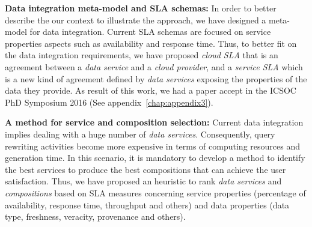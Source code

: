 \bigskip
\noindent \textbf{Data integration meta-model and SLA schemas:}
In order to better describe the our context to illustrate the approach, we have designed a meta-model for data integration. Current SLA schemas are focused on service properties aspects such as availability and response time. Thus, to better fit on the data integration requirements, we have proposed \textsl{cloud SLA} that is an agreement between a \textsl{data service} and a \textsl{cloud provider}, and a \textsl{service SLA} which is a new kind of agreement defined by \textsl{data services} exposing the properties of the data they provide. As result of this work, we had a paper accept in the ICSOC PhD Symposium 2016 (See appendix~\ref{chap:appendix3}).


\bigskip
\noindent \textbf{A method for service and composition selection:}
Current data integration implies dealing with a huge number of \textsl{data services}. Consequently, query rewriting activities become more expensive in terms of computing resources and generation time. In this scenario, it is mandatory to develop a method to identify the best services to produce the best compositions that can achieve the user satisfaction. Thus, we have proposed an heuristic to rank \textsl{data services} and \textsl{compositions} based on SLA measures concerning  service properties (percentage of availability, response time, throughput and others) and data properties (data type, freshness, veracity, provenance and others).

